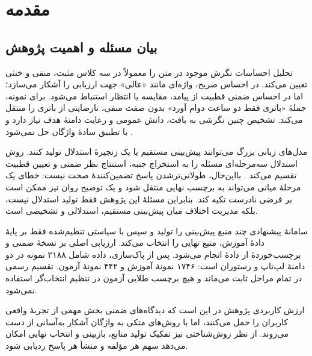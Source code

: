 \makeatletter
\renewcommand*{\bidi@@LTRfootnotetext@font}{%
    \footnotesize\resetlatinfont
    \def\@makefnmark{\hbox{\@textsuperscript{\xepersian@textdigitfont\@thefnmark}}}%
}
\makeatother

\chapter{مقدمه}

\section{بیان مسئله و اهمیت پژوهش}

تحلیل احساسات نگرش موجود در متن را معمولاً در سه کلاس مثبت، منفی و خنثی تعیین می‌کند. در احساس صریح، واژه‌ای مانند «عالی» جهت ارزیابی را آشکار می‌سازد؛ اما در احساس ضمنی قطبیت از پیامد، مقایسه یا انتظار استنباط می‌شود. برای نمونه، جملۀ «باتری فقط دو ساعت دوام آورد» بدون صفت منفی، نارضایتی از باتری را منتقل می‌کند. تشخیص چنین نگرشی به بافت، دانش عمومی و رعایت دامنۀ هدف نیاز دارد و با تطبیق سادۀ واژگان حل نمی‌شود \cite{fei2023thor,duan2024isa}.

مدل‌های زبانی بزرگ می‌توانند پیش‌بینی مستقیم یا یک زنجیرۀ استدلال تولید کنند. روش استدلال سه‌مرحله‌ای  مسئله را به استخراج جنبه، استنتاج نظر ضمنی و تعیین قطبیت تقسیم می‌کند \cite{fei2023thor}. بااین‌حال، طولانی‌ترشدن پاسخ تضمین‌کنندۀ صحت نیست: خطای یک مرحلۀ میانی می‌تواند به برچسب نهایی منتقل شود و یک توضیح روان نیز ممکن است بر فرضی نادرست تکیه کند. بنابراین مسئلۀ این پژوهش فقط تولید استدلال نیست، بلکه مدیریت اختلاف میان پیش‌بینی مستقیم، استدلالی و تشخیصی است.

سامانۀ پیشنهادی چند منبع پیش‌بینی را تولید و سپس با سیاستی تنظیم‌شده فقط بر پایۀ دادۀ آموزش، منبع نهایی را انتخاب می‌کند. ارزیابی اصلی بر نسخۀ ضمنی و برچسب‌خوردۀ  از دادۀ  انجام می‌شود. پس از پاک‌سازی، داده شامل ۲۱۸۸ نمونه در دو دامنۀ لپ‌تاپ و رستوران است: ۱۷۴۶ نمونۀ آموزش و ۴۴۲ نمونۀ آزمون. تقسیم رسمی در تمام مراحل ثابت می‌ماند و هیچ برچسب طلایی آزمون در تنظیم انتخاب‌گر استفاده نمی‌شود.

ارزش کاربردی پژوهش در این است که دیدگاه‌های ضمنی بخش مهمی از تجربۀ واقعی کاربران را حمل می‌کنند، اما با روش‌های متکی به واژگان آشکار به‌آسانی از دست می‌روند. از نظر روش‌شناختی نیز تفکیک تولید منابع، بازبینی و انتخاب نهایی امکان می‌دهد سهم هر مؤلفه و منشأ هر پاسخ ردیابی شود.


